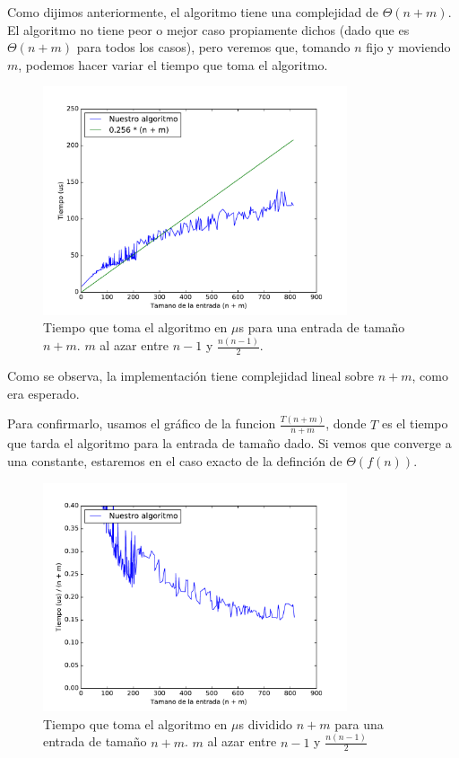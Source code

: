 
Como dijimos anteriormente, el algoritmo tiene una complejidad de $\Theta(n + m)$. El algoritmo no tiene peor o mejor caso propiamente dichos (dado que es $\Theta(n + m)$ para todos los casos), pero veremos que, tomando $n$ fijo y moviendo $m$, podemos hacer variar el tiempo que toma el algoritmo.



\begin{figure}[H]
 \centering
	\includegraphics[width=0.8\textwidth]{img/exp/problema1-promedio.pdf}
	\caption{\footnotesize Tiempo que toma el algoritmo en $\mu$s para una entrada de tamaño $n + m$. $m$ al azar entre $n-1$ y $\frac{n(n-1)}{2}$.}
	\label{fig:problema1-promedio}
\end{figure}

Como se observa, la implementación tiene complejidad lineal sobre $n + m$, como era esperado.

Para confirmarlo, usamos el gráfico de la funcion $\frac{T(n + m)}{n + m}$, donde $T$ es el tiempo que tarda el algoritmo para la entrada de tamaño dado.
Si vemos que converge a una constante, estaremos en el caso exacto de la definción de $\Theta(f(n))$.

\begin{figure}[H]
 \centering
	\includegraphics[width=0.8\textwidth]{img/exp/problema1-promedio2.pdf}
	\caption{\footnotesize Tiempo que toma el algoritmo en $\mu$s dividido $n + m$ para una entrada de tamaño $n + m$.  $m$ al azar entre $n-1$ y $\frac{n(n-1)}{2}$}
	\label{fig:problema1-promedio2}
\end{figure}

